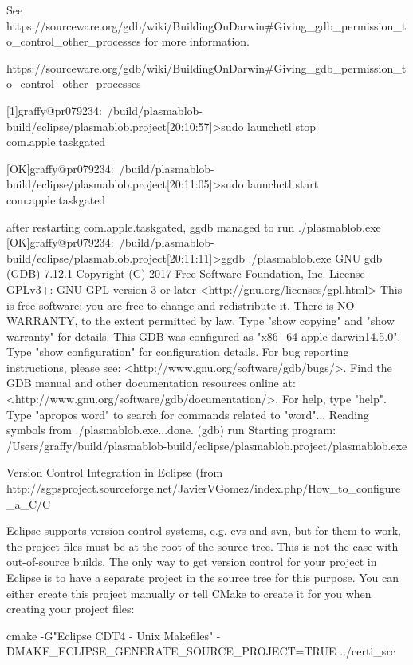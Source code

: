 \documentclass[a4paper]{report}
\begin{document}
			See https://sourceware.org/gdb/wiki/BuildingOnDarwin#Giving_gdb_permission_to_control_other_processes
			for more information.
			
		https://sourceware.org/gdb/wiki/BuildingOnDarwin#Giving_gdb_permission_to_control_other_processes
	
		[1]graffy@pr079234:~/build/plasmablob-build/eclipse/plasmablob.project[20:10:57]>sudo launchctl stop com.apple.taskgated

		[OK]graffy@pr079234:~/build/plasmablob-build/eclipse/plasmablob.project[20:11:05]>sudo launchctl start com.apple.taskgated

		after restarting com.apple.taskgated, ggdb managed to run ./plasmablob.exe
		[OK]graffy@pr079234:~/build/plasmablob-build/eclipse/plasmablob.project[20:11:11]>ggdb ./plasmablob.exe 
		GNU gdb (GDB) 7.12.1
		Copyright (C) 2017 Free Software Foundation, Inc.
		License GPLv3+: GNU GPL version 3 or later <http://gnu.org/licenses/gpl.html>
		This is free software: you are free to change and redistribute it.
		There is NO WARRANTY, to the extent permitted by law.  Type "show copying"
		and "show warranty" for details.
		This GDB was configured as "x86_64-apple-darwin14.5.0".
		Type "show configuration" for configuration details.
		For bug reporting instructions, please see:
		<http://www.gnu.org/software/gdb/bugs/>.
		Find the GDB manual and other documentation resources online at:
		<http://www.gnu.org/software/gdb/documentation/>.
		For help, type "help".
		Type "apropos word" to search for commands related to "word"...
		Reading symbols from ./plasmablob.exe...done.
		(gdb) run
		Starting program: /Users/graffy/build/plasmablob-build/eclipse/plasmablob.project/plasmablob.exe 
		
		Version Control Integration in Eclipse (from http://sgpsproject.sourceforge.net/JavierVGomez/index.php/How_to_configure_a_C/C%

			Eclipse supports version control systems, e.g. cvs and svn, but for them to work, the project files must be at the root of the source tree. This is not the case with out-of-source builds. The only way to get version control for your project in Eclipse is to have a separate project in the source tree for this purpose. You can either create this project manually or tell CMake to create it for you when creating your project files:

			cmake -G"Eclipse CDT4 - Unix Makefiles" -DMAKE_ECLIPSE_GENERATE_SOURCE_PROJECT=TRUE ../certi_src
\end{document}
